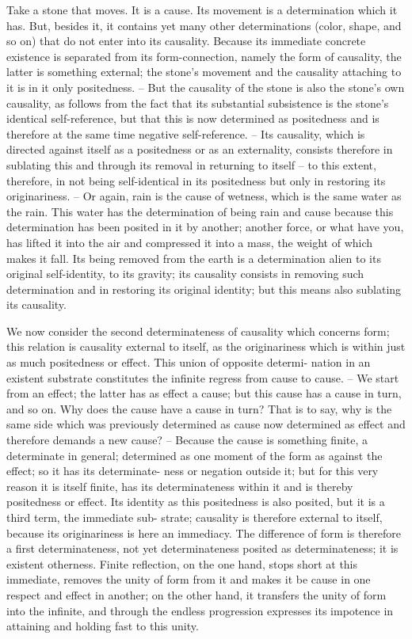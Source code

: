 Take a stone that moves. It is a cause. Its movement is a determination
which it has. But, besides it, it contains yet many other determinations
(color, shape, and so on) that do not enter into its causality. Because
its immediate concrete existence is separated from its form-connection,
namely the form of causality, the latter is something external; the stone’s
movement and the causality attaching to it is in it only positedness. – But
the causality of the stone is also the stone’s own causality, as follows from
the fact that its substantial subsistence is the stone’s identical self-reference,
but that this is now determined as positedness and is therefore at the same
time negative self-reference. – Its causality, which is directed against itself as
a positedness or as an externality, consists therefore in sublating this and
through its removal in returning to itself – to this extent, therefore, in not
being self-identical in its positedness but only in restoring its originariness. –
Or again, rain is the cause of wetness, which is the same water as the rain.
This water has the determination of being rain and cause because this
determination has been posited in it by another; another force, or what
have you, has lifted it into the air and compressed it into a mass, the weight
of which makes it fall. Its being removed from the earth is a determination
alien to its original self-identity, to its gravity; its causality consists in
removing such determination and in restoring its original identity; but this
means also sublating its causality.

We now consider the second determinateness of causality which concerns
form; this relation is causality external to itself, as the originariness which is
within just as much positedness or effect. This union of opposite determi-
nation in an existent substrate constitutes the infinite regress from cause to
cause. – We start from an effect; the latter has as effect a cause; but this
cause has a cause in turn, and so on. Why does the cause have a cause in
turn? That is to say, why is the same side which was previously determined
as cause now determined as effect and therefore demands a new cause? –
Because the cause is something finite, a determinate in general; determined
as one moment of the form as against the effect; so it has its determinate-
ness or negation outside it; but for this very reason it is itself finite, has its
determinateness within it and is thereby positedness or effect. Its identity as
this positedness is also posited, but it is a third term, the immediate sub-
strate; causality is therefore external to itself, because its originariness is here
an immediacy. The difference of form is therefore a first determinateness,
not yet determinateness posited as determinateness; it is existent otherness.
Finite reflection, on the one hand, stops short at this immediate, removes
the unity of form from it and makes it be cause in one respect and effect in
another; on the other hand, it transfers the unity of form into the infinite,
and through the endless progression expresses its impotence in attaining
and holding fast to this unity.

